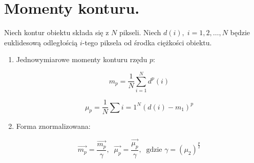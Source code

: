 \documentclass[a4paper,10pt]{article}
\begin{document}
\section{Momenty konturu.}
Niech kontur obiektu składa się z $N$ pikseli. 
Niech $d(i),\; i=1,2,\ldots,N$ będzie euklidesową odległością $i$-tego piksela od środka ciężkości obiektu.

\begin{enumerate}
\item Jednowymiarowe momenty konturu rzędu $p$:

\begin{equation}
m_p = \frac{1}{N} \sum_{i=1}^{N} d^p(i)
\end{equation}

\begin{equation}
\mu_p = \frac{1}{N} \sum{i=1}^{N} (d(i) - m_1)^p
\end{equation}

\item Forma znormalizowana:

\begin{equation}
\overrightarrow{m_p} = \frac{\overrightarrow{m_p}}{\gamma},\;\; \overrightarrow{\mu_p} = \frac{\overrightarrow{\mu_p}}{\gamma}, \;\; \mbox{gdzie } \gamma = (\mu_2)^{\frac{p}{2}}
\end{equation}
\end{enumerate}
\end{document}
